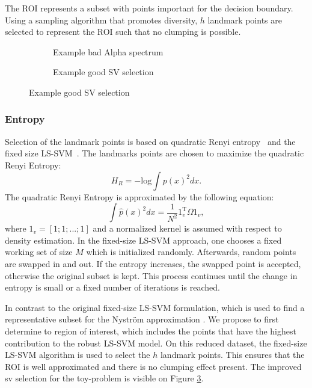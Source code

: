 \documentclass[preprint,12pt]{elsarticle}
\begin{document}
The ROI represents a subset with points important for the decision boundary. Using a sampling algorithm that promotes diversity, $h$ landmark points are selected to represent the ROI such that no clumping is possible.


\begin{figure}[h]
	\centering
	\begin{subfigure}[b]{0.3\textwidth}
		\label{fig:BadAlpha}
		\caption{Example bad Alpha spectrum}
	\end{subfigure}
	\begin{subfigure}[b]{0.3\textwidth}
		\label{fig:GoodPruning}
		\caption{Example good SV selection}
	\end{subfigure}
\end{figure}

\subsubsection{Entropy}
Selection of the landmark points is based on quadratic Renyi entropy~\cite{girolami2002orthogonal} and the fixed size LS-SVM~\cite{suykens2002least}. The landmarks points are chosen to maximize the quadratic Renyi Entropy:
\begin{equation}
H_R = -\mathrm{log}\int p(x)^2 dx.
\end{equation}
The quadratic Renyi Entropy is approximated by the following equation\cite{girolami2002orthogonal}:
\begin{equation}
\int \hat{p}(x)^2dx = \frac{1}{N^2} 1_v^\mathrm{T}\Omega 1_v,
\end{equation}
where $1_v = [1;1;...;1]$ and a normalized kernel is assumed with respect to density estimation. In the fixed-size LS-SVM approach, one chooses a fixed working set of size $M$ which is initialized randomly. Afterwards, random points are swapped in and out. If the entropy increases, the swapped point is accepted, otherwise the original subset is kept. This process continues until the change in entropy is small or a fixed number of iterations is reached. 

In contrast to the original fixed-size LS-SVM formulation, which is used to find a representative subset for the Nystr\"{o}m approximation \cite{suykens2002least}. We propose to first determine to region of interest, which includes the points that have the highest contribution to the robust LS-SVM model. On this reduced dataset, the fixed-size LS-SVM algorithm is used to select the $h$ landmark points. This ensures that the ROI is well approximated and there is no clumping effect present. The improved sv selection for the toy-problem is visible on Figure \ref{fig:GoodPruning}.
\end{document}
